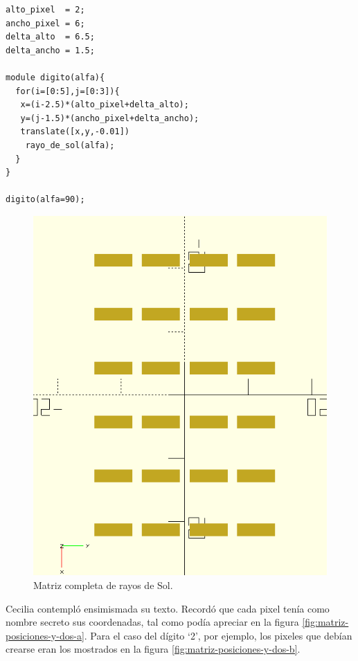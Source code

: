     \begin{lstlisting}
alto_pixel  = 2;
ancho_pixel = 6;      
delta_alto  = 6.5;
delta_ancho = 1.5;

module digito(alfa){
  for(i=[0:5],j=[0:3]){
   x=(i-2.5)*(alto_pixel+delta_alto);
   y=(j-1.5)*(ancho_pixel+delta_ancho);
   translate([x,y,-0.01])
    rayo_de_sol(alfa);
  } 
}

digito(alfa=90);
\end{lstlisting}

\begin{figure}[ht]
  \centering
  \includegraphics[width=.36\textwidth]{imagenes/matriz-completa-centrada-0}
  \caption{Matriz completa de rayos de Sol.}
  \label{fig:matriz-completa-centrada-1}
\end{figure}


Cecilia contempló ensimismada su texto. Recordó que cada pixel tenía
como nombre secreto sus coordenadas, tal como podía apreciar en la
figura \ref{fig:matriz-posiciones-y-dos-a}. Para el caso del dígito
`2', por ejemplo, los pixeles que debían crearse eran los mostrados en
la figura \ref{fig:matriz-posiciones-y-dos-b}.    

